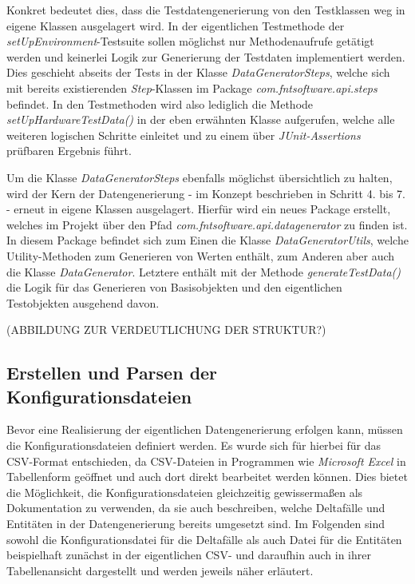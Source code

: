 Konkret bedeutet dies, dass die Testdatengenerierung von den Testklassen weg in eigene Klassen ausgelagert wird. In der eigentlichen Testmethode der \textit{setUpEnvironment}-Testsuite sollen möglichst nur Methodenaufrufe getätigt werden und keinerlei Logik zur Generierung der Testdaten implementiert werden. Dies geschieht abseits der Tests in der Klasse \textit{DataGeneratorSteps}, welche sich mit bereits existierenden \textit{Step}-Klassen im Package \textit{com.fntsoftware.api.steps} befindet. In den Testmethoden wird also lediglich die Methode \textit{setUpHardwareTestData()} in der eben erwähnten Klasse aufgerufen, welche alle weiteren logischen Schritte einleitet und zu einem über \textit{JUnit-Assertions} prüfbaren Ergebnis führt.

Um die Klasse \textit{DataGeneratorSteps} ebenfalls möglichst übersichtlich zu halten, wird der Kern der Datengenerierung - im Konzept beschrieben in Schritt 4. bis 7. - erneut in eigene Klassen ausgelagert. Hierfür wird ein neues Package erstellt, welches im Projekt über den Pfad \textit{com.fntsoftware.api.datagenerator} zu finden ist. In diesem Package befindet sich zum Einen die Klasse \textit{DataGeneratorUtils}, welche Utility-Methoden zum Generieren von Werten enthält, zum Anderen aber auch die Klasse \textit{DataGenerator}. Letztere enthält mit der Methode \textit{generateTestData()} die Logik für das Generieren von Basisobjekten und den eigentlichen Testobjekten ausgehend davon.

(ABBILDUNG ZUR VERDEUTLICHUNG DER STRUKTUR?)

\subsection{Erstellen und Parsen der Konfigurationsdateien}\label{subsec:config}
Bevor eine Realisierung der eigentlichen Datengenerierung erfolgen kann, müssen die Konfigurationsdateien definiert werden. Es wurde sich für hierbei für das \ac{CSV}-Format entschieden, da \ac{CSV}-Dateien in Programmen wie \textit{Microsoft Excel} in Tabellenform geöffnet und auch dort direkt bearbeitet werden können. \cite{excel:2022} Dies bietet die Möglichkeit, die Konfigurationsdateien gleichzeitig gewissermaßen als Dokumentation zu verwenden, da sie auch beschreiben, welche Deltafälle und Entitäten in der Datengenerierung bereits umgesetzt sind. Im Folgenden sind sowohl die Konfigurationsdatei für die Deltafälle als auch Datei für die Entitäten beispielhaft zunächst in der eigentlichen \ac{CSV}- und daraufhin auch in ihrer Tabellenansicht dargestellt und werden jeweils näher erläutert.

